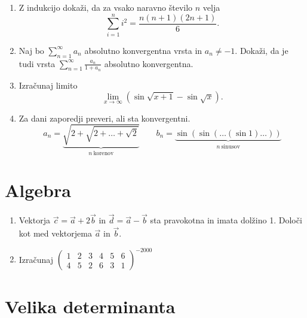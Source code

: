 \documentclass[a4paper,12pt]{article}
\begin{document}
\begin{enumerate}
\item
Z indukcijo dokaži, da za vsako naravno število \(n\) velja
\[\sum_{i=1}^{n}i^2 = \frac{n(n+1)(2n+1)}{6}.\]

\item
Naj bo \(\sum_{n=1}^{\infty}a_n\) absolutno konvergentna vrsta in \(a_n \ne -1\).
Dokaži, da je tudi vrsta \(\sum_{n=1}^\infty \frac{a_n}{1+a_n}\)
absolutno konvergentna.

\item
Izračunaj limito
\[\lim_{x \rightarrow \infty}(\sin \sqrt{x+1}- \sin \sqrt{x}).\]

\item
Za dani zaporedji preveri, ali sta konvergentni.
\[a_n = \underbrace{\sqrt{2+\sqrt{2+\dots+\sqrt{2}}}}_{n~\text{korenov}} \qquad
 b_n = \underbrace{\sin(\sin(\dots(\sin 1)\dots))}_{n~\text{sinusov}}\]
\end{enumerate}

\section*{Algebra}

\begin{enumerate}
\item
Vektorja \(\vec{c} = \vec{a} + 2\vec{b}\) in \(\vec{d} = \vec{a} - \vec{b}\)
sta pravokotna in imata dolžino 1. Določi kot med vektorjema \(\vec{a}\) in \(\vec{b}\).

\item
Izračunaj
\(\begin{pmatrix}
    1& 2& 3& 4& 5& 6\\
    4& 5& 2& 6& 3& 1
\end{pmatrix}^{-2000}\)
\end{enumerate}

\section*{Velika determinanta}
\end{document}
